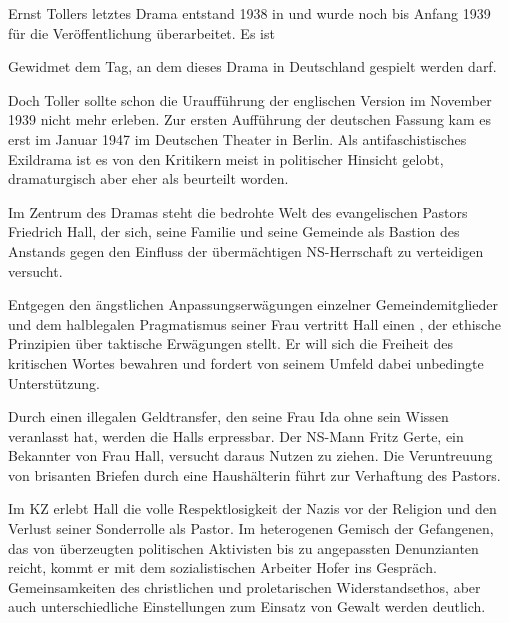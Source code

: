 

Ernst Tollers letztes Drama entstand 1938 in \Cite{New York, Barcelona,
  Cassis}  und wurde noch bis Anfang 1939 für die
Veröffentlichung überarbeitet. Es ist 

\begin{BlockQuote}
Gewidmet dem Tag, an dem dieses Drama in Deutschland gespielt werden
darf. 
\end{BlockQuote}
Doch Toller sollte schon die Uraufführung der englischen Version im
November 1939 nicht mehr erleben. Zur ersten Aufführung der deutschen Fassung
kam es erst im Januar 1947 im Deutschen Theater in Berlin. Als
antifaschistisches Exildrama ist es von den Kritikern meist in politischer
Hinsicht gelobt, dramaturgisch aber eher als \Cite{schwach} beurteilt
worden. 
  

Im Zentrum des Dramas steht die bedrohte Welt des evangelischen Pastors
Friedrich Hall, der sich, seine Familie und seine Gemeinde als Bastion des
Anstands gegen den Einfluss der übermächtigen NS-Herrschaft zu verteidigen
versucht.

Entgegen den ängstlichen Anpassungserwägungen einzelner Gemeindemitglieder und
dem halblegalen Pragmatismus seiner Frau vertritt Hall einen \Cite{Weg der
Wahrheit} , der ethische Prinzipien über taktische
Erwägungen stellt. Er will
sich die Freiheit des kritischen Wortes bewahren und fordert von seinem Umfeld
dabei unbedingte Unterstützung.

Durch einen illegalen Geldtransfer, den seine Frau Ida ohne sein Wissen
veranlasst hat, werden die Halls erpressbar. Der NS-Mann Fritz Gerte, ein
Bekannter von Frau Hall, versucht daraus Nutzen zu ziehen. Die Veruntreuung
von brisanten Briefen durch eine Haushälterin führt zur Verhaftung des
Pastors.

Im KZ erlebt Hall die volle Respektlosigkeit der Nazis vor der Religion und
den Verlust seiner Sonderrolle als Pastor. Im heterogenen Gemisch der
Gefangenen, das von überzeugten politischen Aktivisten bis zu angepassten
Denunzianten reicht, kommt er mit dem sozialistischen Arbeiter Hofer ins
Gespräch. Gemeinsamkeiten des christlichen und proletarischen
Widerstandsethos, aber auch unterschiedliche Einstellungen zum Einsatz von
Gewalt werden deutlich.

